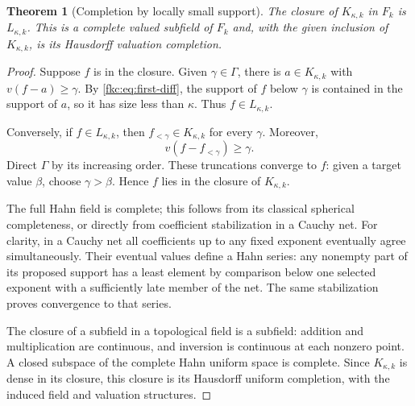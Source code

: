 \documentclass[11pt,letterpaper]{article}
\numberwithin{equation}{section}
\newtheorem{theorem}{Theorem}[section]
\theoremstyle{definition}
\theoremstyle{remark}
\newcommand{\K}{K_{\kappa,k}}
\begin{document}
\begin{theorem}[Completion by locally small support]\label{fkc:thm:completion}
The closure of $\K$ in $F_k$ is $L_{\kappa,k}$. This is a complete valued subfield of $F_k$ and, with the given inclusion of $\K$, is its Hausdorff valuation completion.
\end{theorem}
\begin{proof}
Suppose $f$ is in the closure. Given $\gamma\in\Gamma$, there is $a\in\K$ with $v(f-a)\ge\gamma$. By \eqref{fkc:eq:first-diff}, the support of $f$ below $\gamma$ is contained in the support of $a$, so it has size less than $\kappa$. Thus $f\in L_{\kappa,k}$.

Conversely, if $f\in L_{\kappa,k}$, then $f_{<\gamma}\in\K$ for every $\gamma$. Moreover,
\[
 v(f-f_{<\gamma})\ge\gamma.
\]
Direct $\Gamma$ by its increasing order. These truncations converge to $f$: given a target value $\beta$, choose $\gamma>\beta$. Hence $f$ lies in the closure of $\K$.

The full Hahn field is complete; this follows from its classical spherical completeness, or directly from coefficient stabilization in a Cauchy net. For clarity, in a Cauchy net all coefficients up to any fixed exponent eventually agree simultaneously. Their eventual values define a Hahn series: any nonempty part of its proposed support has a least element by comparison below one selected exponent with a sufficiently late member of the net. The same stabilization proves convergence to that series.

The closure of a subfield in a topological field is a subfield: addition and multiplication are continuous, and inversion is continuous at each nonzero point. A closed subspace of the complete Hahn uniform space is complete. Since $\K$ is dense in its closure, this closure is its Hausdorff uniform completion, with the induced field and valuation structures.
\end{proof}
\end{document}
